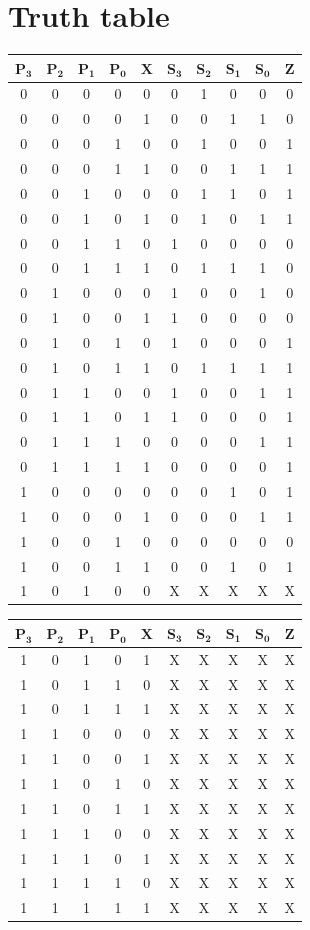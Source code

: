 \documentclass[journal,10pt,twocolumn]{article}
\begin{document}
\section*{\large Truth table}
{
\centering
\begin{tabular}{|c|c|c|c|c|c|c|c|c|c|}
\hline
$\boldsymbol{P_3}$&$\boldsymbol{P_2}$&$\boldsymbol{P_1}$&$\boldsymbol{P_0}$&$\boldsymbol{X}$&$\boldsymbol{S_3}$&$\boldsymbol{S_2}$&$\boldsymbol{S_1}$&$\boldsymbol{S_0}$&$\boldsymbol{Z}$\\
\hline
0&0&0&0&0&0&1&0&0&0\\%
\hline
0&0&0&0&1&0&0&1&1&0\\%
\hline
0&0&0&1&0&0&1&0&0&1\\%
\hline
0&0&0&1&1&0&0&1&1&1\\%
\hline
0&0&1&0&0&0&1&1&0&1\\%
\hline
0&0&1&0&1&0&1&0&1&1\\%
\hline
0&0&1&1&0&1&0&0&0&0\\%
\hline
0&0&1&1&1&0&1&1&1&0\\%
\hline
0&1&0&0&0&1&0&0&1&0\\%
\hline
0&1&0&0&1&1&0&0&0&0\\%
\hline
0&1&0&1&0&1&0&0&0&1\\%
\hline
0&1&0&1&1&0&1&1&1&1\\%
\hline
0&1&1&0&0&1&0&0&1&1\\%
\hline
0&1&1&0&1&1&0&0&0&1\\%
\hline
0&1&1&1&0&0&0&0&1&1\\%
\hline
0&1&1&1&1&0&0&0&0&1\\%
\hline
1&0&0&0&0&0&0&1&0&1\\%
\hline
1&0&0&0&1&0&0&0&1&1\\%
\hline
1&0&0&1&0&0&0&0&0&0\\%
\hline
1&0&0&1&1&0&0&1&0&1\\%
\hline
1&0&1&0&0&X&X&X&X&X\\%
\hline
\end{tabular}\par
}
{
\centering
\begin{tabular}{|c|c|c|c|c|c|c|c|c|c|}
\hline
$\boldsymbol{P_3}$&$\boldsymbol{P_2}$&$\boldsymbol{P_1}$&$\boldsymbol{P_0}$&$\boldsymbol{X}$&$\boldsymbol{S_3}$&$\boldsymbol{S_2}$&$\boldsymbol{S_1}$&$\boldsymbol{S_0}$&$\boldsymbol{Z}$\\
\hline
1&0&1&0&1&X&X&X&X&X\\%
\hline
1&0&1&1&0&X&X&X&X&X\\%
\hline
1&0&1&1&1&X&X&X&X&X\\%
\hline
1&1&0&0&0&X&X&X&X&X\\%
\hline
1&1&0&0&1&X&X&X&X&X\\%
\hline
1&1&0&1&0&X&X&X&X&X\\%
\hline
1&1&0&1&1&X&X&X&X&X\\%
\hline
1&1&1&0&0&X&X&X&X&X\\%
\hline
1&1&1&0&1&X&X&X&X&X\\%
\hline
1&1&1&1&0&X&X&X&X&X\\%
\hline
1&1&1&1&1&X&X&X&X&X\\%
\hline
\end{tabular}\par
}
\end{document}
